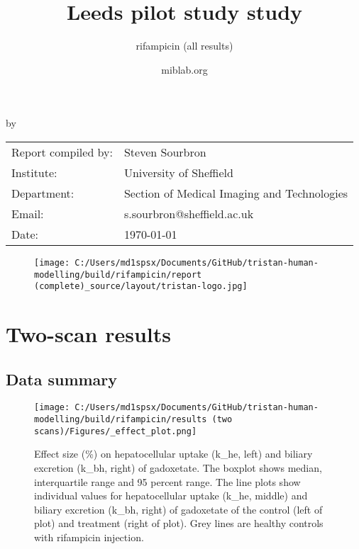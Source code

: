 \documentclass{epflreport}%
\begin{document}
%
\normalsize%
\frontmatter%
\title{Leeds pilot study study}%
\subtitle{rifampicin (all results)}%
\author{miblab.org}%
\subject{D2.13 {-} Internal report}%
%
%
%
\makecover%
\begin{titlepage}%
\begin{center}%
\makeatletter%
\largetitlestyle\fontsize{45}{45}\selectfont\@title%
\makeatother%
\linebreak%
\makeatletter%
\ifdefvoid{\@subtitle}{}{\bigskip\titlestyle\fontsize{20}{20}\selectfont\@subtitle}%
\makeatother%
\linebreak%
\bigskip%
\bigskip%
by%
\linebreak%
\bigskip%
\bigskip%
\makeatletter%
\largetitlestyle\fontsize{25}{25}\selectfont\@author%
\makeatother%
\vfill%
\large%
\begin{tabular}{ll}%
\hline%
Report compiled by: &Steven Sourbron\\%
Institute: &University of Sheffield\\%
Department: &Section of Medical Imaging and Technologies\\%
Email: &s.sourbron@sheffield.ac.uk\\%
Date: &\today\\%
\hline%
\end{tabular}%


\begin{figure}[b!]%
\centering%
\centering%
\texttt{[image: C:/Users/md1spsx/Documents/GitHub/tristan-human-modelling/build/rifampicin/report (complete)\_source/layout/tristan-logo.jpg]}%
\end{figure}

%
\end{center}%
\end{titlepage}%
\newpage%
\tableofcontents%
\mainmatter%
\clearpage%
\chapter{Two{-}scan results}%
\section{Data summary}%
\label{sec:Datasummary}%

%


\begin{figure}[h!]%
\centering%
\texttt{[image: C:/Users/md1spsx/Documents/GitHub/tristan-human-modelling/build/rifampicin/results (two scans)/Figures/\_effect\_plot.png]}%
\caption{Effect size (\%) on hepatocellular uptake (k\_he, left) and biliary excretion (k\_bh, right) of gadoxetate. The boxplot shows median, interquartile range and 95 percent range. The line plots show individual values for hepatocellular uptake (k\_he, middle) and biliary excretion (k\_bh, right) of gadoxetate of the control (left of plot) and treatment (right of plot). Grey lines are healthy controls with rifampicin injection.}%
\end{figure}
\end{document}

